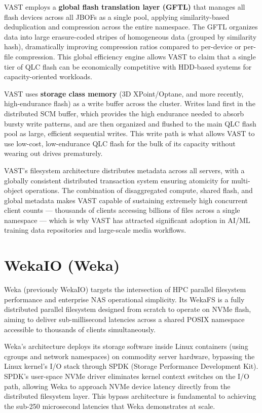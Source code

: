 VAST employs a \textbf{global flash translation layer (GFTL)} that manages all flash devices across all JBOFs as a single pool, applying similarity-based deduplication and compression across the entire namespace. The GFTL organizes data into large erasure-coded stripes of homogeneous data (grouped by similarity hash), dramatically improving compression ratios compared to per-device or per-file compression. This global efficiency engine allows VAST to claim that a single tier of QLC flash can be economically competitive with HDD-based systems for capacity-oriented workloads.

VAST uses \textbf{storage class memory} (3D XPoint/Optane, and more recently, high-endurance flash) as a write buffer across the cluster. Writes land first in the distributed SCM buffer, which provides the high endurance needed to absorb bursty write patterns, and are then organized and flushed to the main QLC flash pool as large, efficient sequential writes. This write path is what allows VAST to use low-cost, low-endurance QLC flash for the bulk of its capacity without wearing out drives prematurely.

VAST's filesystem architecture distributes metadata across all servers, with a globally consistent distributed transaction system ensuring atomicity for multi-object operations. The combination of disaggregated compute, shared flash, and global metadata makes VAST capable of sustaining extremely high concurrent client counts --- thousands of clients accessing billions of files across a single namespace --- which is why VAST has attracted significant adoption in AI/ML training data repositories and large-scale media workflows.

\section{WekaIO (Weka)}
Weka (previously WekaIO) targets the intersection of HPC parallel filesystem performance and enterprise NAS operational simplicity. Its WekaFS is a fully distributed parallel filesystem designed from scratch to operate on NVMe flash, aiming to deliver sub-millisecond latencies across a shared POSIX namespace accessible to thousands of clients simultaneously.

Weka's architecture deploys its storage software inside Linux containers (using cgroups and network namespaces) on commodity server hardware, bypassing the Linux kernel's I/O stack through SPDK (Storage Performance Development Kit). SPDK's user-space NVMe driver eliminates kernel context switches on the I/O path, allowing Weka to approach NVMe device latency directly from the distributed filesystem layer. This bypass architecture is fundamental to achieving the sub-250 microsecond latencies that Weka demonstrates at scale.

